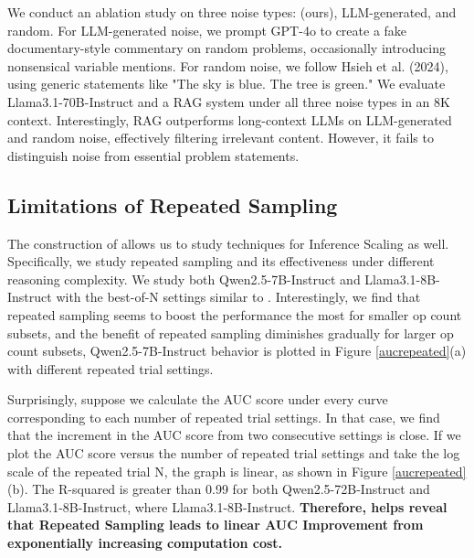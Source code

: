We conduct an ablation study on three noise types: \sysb (ours), LLM-generated, and random. For LLM-generated noise, we prompt GPT-4o to create a fake documentary-style commentary on random problems, occasionally introducing nonsensical variable mentions. For random noise, we follow Hsieh et al. (2024), using generic statements like "The sky is blue. The tree is green." We evaluate Llama3.1-70B-Instruct and a RAG system under all three noise types in an 8K context. Interestingly, RAG outperforms long-context LLMs on LLM-generated and random noise, effectively filtering irrelevant content. However, it fails to distinguish \sysb noise from essential problem statements.

\subsection{Limitations of Repeated Sampling} 
\label{resam} 
The construction of \sysb allows us to study techniques for Inference Scaling as well. Specifically, we study repeated sampling \citep{brown2024large,snell2024scalingllmtesttimecompute} and its effectiveness under different reasoning complexity. We study both Qwen2.5-7B-Instruct and Llama3.1-8B-Instruct with the best-of-N settings similar to \citet{brown2024largelanguagemonkeysscaling}. Interestingly, we find that repeated sampling seems to boost the performance the most for smaller op count subsets, and the benefit of repeated sampling diminishes gradually for larger op count subsets, Qwen2.5-7B-Instruct behavior is plotted in Figure \ref{aucrepeated}(a) with different repeated trial settings. 

Surprisingly, suppose we calculate the AUC score under every curve corresponding to each number of repeated trial settings. In that case, we find that the increment in the AUC score from two consecutive settings is close. If we plot the AUC score versus the number of repeated trial settings and take the log scale of the repeated trial N, the graph is linear, as shown in Figure \ref{aucrepeated}(b). The R-squared is greater than 0.99 for both Qwen2.5-72B-Instruct and Llama3.1-8B-Instruct, where Llama3.1-8B-Instruct. \textbf{Therefore, \sysb helps reveal that Repeated Sampling leads to linear AUC Improvement from exponentially increasing computation cost.} 
